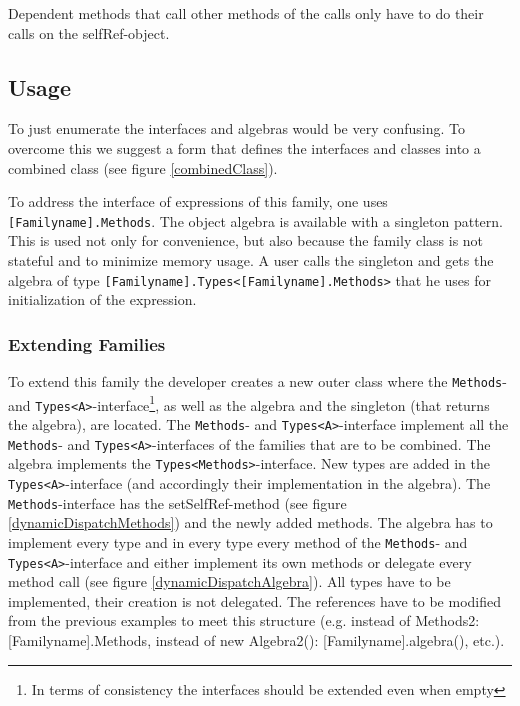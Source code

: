 \documentclass{report}
\begin{document}
Dependent methods that call other methods of the calls only have to do their calls on the selfRef-object.

\subsection{Usage}
\label{combiningTheParts}
To just enumerate the interfaces and algebras would be very confusing. To overcome this we suggest a form that defines the interfaces and classes into a combined class (see figure \ref{combinedClass}).

To address the interface of expressions of this family, one uses \lstinline{[Familyname].Methods}. The object algebra is available with a singleton pattern. This is used not only for convenience, but also because the family class is not stateful and to minimize memory usage. A user calls the singleton and gets the algebra of type \lstinline{[Familyname].Types<[Familyname].Methods>} that he uses for initialization of the expression.

\subsubsection*{Extending Families}
\label{extendingFamilies}

To extend this family the developer creates a new outer class where the \lstinline{Methods}- and \lstinline{Types<A>}-interface\footnote{In terms of consistency the interfaces should be extended even when empty}, as well as the algebra and the singleton (that returns the algebra), are located. The \lstinline{Methods}- and \lstinline{Types<A>}-interface implement all the \lstinline{Methods}- and \lstinline{Types<A>}-interfaces of the families that are to be combined. The algebra implements the \lstinline{Types<Methods>}-interface. New types are added in the \lstinline{Types<A>}-interface (and accordingly their implementation in the algebra). The \lstinline{Methods}-interface has the setSelfRef-method (see figure \ref{dynamicDispatchMethods}) and the newly added methods. The algebra has to implement every type and in every type every method of the \lstinline{Methods}- and \lstinline{Types<A>}-interface and either implement its own methods or delegate every method call (see figure \ref{dynamicDispatchAlgebra}). All types have to be implemented, their creation is not delegated. The references have to be modified from the previous examples to meet this structure (e.g. instead of Methods2: [Familyname].Methods, instead of new Algebra2(): [Familyname].algebra(), etc.).
\end{document}
